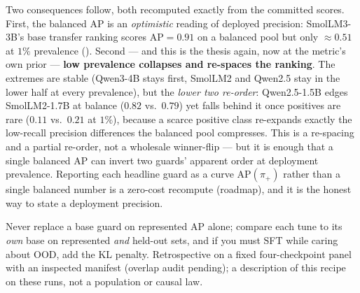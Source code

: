 Two consequences follow, both recomputed exactly from the committed scores. First, the balanced AP is an
\emph{optimistic} reading of deployed precision: SmolLM3-3B's base transfer ranking scores $\mathrm{AP}=0.91$
on a balanced pool but only $\approx0.51$ at $1\%$ prevalence (). Second --- and this is
the thesis again, now at the metric's own prior --- \textbf{low prevalence collapses and re-spaces the
ranking}. The extremes are stable (Qwen3-4B stays first, SmolLM2 and Qwen2.5 stay in the lower half at every
prevalence), but the \emph{lower two re-order}: Qwen2.5-1.5B edges SmolLM2-1.7B at balance ($0.82$ vs.\ $0.79$)
yet falls behind it once positives are rare ($0.11$ vs.\ $0.21$ at $1\%$), because a scarce positive class
re-expands exactly the low-recall precision differences the balanced pool compresses. This is a re-spacing and
a partial re-order, not a wholesale winner-flip --- but it is enough that a single balanced AP can invert two
guards' apparent order at deployment prevalence. Reporting each headline guard as a curve $\mathrm{AP}(\pi_+)$
rather than a single balanced number is a zero-cost recompute (roadmap), and it is the honest way to state a
deployment precision.

{Never replace a base guard on represented AP alone; compare each tune to its \emph{own} base on
represented \emph{and} held-out sets, and if you must SFT while caring about OOD, add the KL penalty.}
{Retrospective on a fixed four-checkpoint panel with an inspected manifest (overlap audit pending); a
description of this recipe on these runs, not a population or causal law.}
